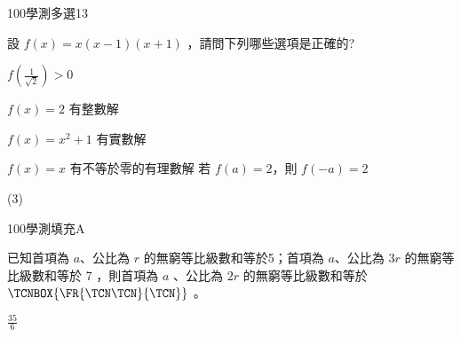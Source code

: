     \begin{QUESTION}
        \begin{ExamInfo}{100}{學測}{多選}{13}
        \end{ExamInfo}
        \begin{ExamAnsRateInfo}{39}{64}{32}{21}
        \end{ExamAnsRateInfo}
        \begin{QBODY}
            設 $f(x) = x(x -1)(x +1)$ ，請問下列哪些選項是正確的? 
			\begin{QOPS} 
				\QOP $f(\frac{1}{\sqrt{2}})>0$

				\QOP $f(x)=2$ 有整數解

				\QOP $f(x)=x^2+1$ 有實數解

				\QOP  $f(x) = x$ 有不等於零的有理數解 
				\QOP 若 $f(a)=2$，則 $f(-a)=2$
			\end{QOPS}
        \end{QBODY}
        \begin{QFROMS}
        \end{QFROMS}
        \begin{QTAGS}\end{QTAGS}
        \begin{QANS}
            (3)
        \end{QANS}
        \begin{QSOLLIST}
        \end{QSOLLIST}
        \begin{QEMPTYSPACE}
        \end{QEMPTYSPACE}
    \end{QUESTION}
    \begin{QUESTION}
        \begin{ExamInfo}{100}{學測}{填充}{A}
        \end{ExamInfo}
        \begin{ExamAnsRateInfo}{49}{92}{50}{5}
        \end{ExamAnsRateInfo}
        \begin{QBODY}
            已知首項為 $a$、公比為 $r$ 的無窮等比級數和等於5；首項為 $a$、公比為 $3r$ 的無窮等比級數和等於 7 ，則首項為 $a$ 、公比為 $2r$ 的無窮等比級數和等於 $\TCNBOX{\FR{\TCN\TCN}{\TCN}}$ 。
        \end{QBODY}
        \begin{QFROMS}
        \end{QFROMS}
        \begin{QTAGS}\end{QTAGS}
        \begin{QANS}
            $\frac{35}{6}$
        \end{QANS}
        \begin{QSOLLIST}
        \end{QSOLLIST}
        \begin{QEMPTYSPACE}
        \end{QEMPTYSPACE}
    \end{QUESTION}
